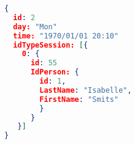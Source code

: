 \begin{lstlisting}[language=json,firstnumber=1]
{
  id: 2
  day: "Mon"
  time: "1970/01/01 20:10"
  idTypeSession: [{
  	0: {
	  id: 55
	  IdPerson: {
	    id: 1,
	    LastName: "Isabelle",
	    FirstName: "Smits"
	    }
	  }
   }]
}
\end{lstlisting}